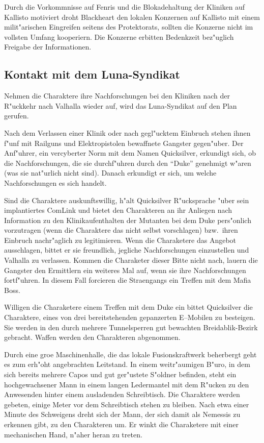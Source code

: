 Durch die Vorkommnisse auf Fenris und die Blokadehaltung der Kliniken auf Kallisto motiviert droht Blackheart den lokalen Konzernen auf Kallisto mit einem milit"arischen Eingreifen seitens des Protektorats, sollten die Konzerne nicht im vollsten Umfang kooperiern. Die Konzerne erbitten Bedenkzeit bez"uglich Freigabe der Informationen.

\subsection{Kontakt mit dem Luna-Syndikat}

Nehmen die Charaktere ihre Nachforschungen bei den Kliniken nach der R"uckkehr nach Valhalla wieder auf, wird das Luna-Syndikat auf den Plan gerufen.

Nach dem Verlassen einer Klinik oder nach gegl"ucktem Einbruch stehen ihnen f"unf mit Railguns und Elektropistolen bewaffnete Gangster gegen"uber. Der Anf"uhrer, ein vercyberter Norm mit dem Namen Quicksilver, erkundigt sich, ob die Nachforschungen, die sie durchf"uhren durch den "`Duke"' genehmigt w"aren (was sie nat"urlich nicht sind). Danach erkundigt er sich, um welche Nachforschungen es sich handelt.

Sind die Charaktere auskunftswillig, h"alt Quicksilver R"ucksprache "uber sein implantiertes ComLink und bietet den Charakteren an ihr Anliegen nach Information zu den Klinikaufenthalten der Mutanten bei dem Duke pers"onlich vorzutragen (wenn die Charaktere das nicht selbst vorschlagen) bzw.~ihren Einbruch nachr"aglich zu legitimieren. Wenn die Charaketere das Angebot ausschlagen, bittet er sie freundlich, jegliche Nachforschungen einzustellen und Valhalla zu verlassen. Kommen die Charaketer dieser Bitte nicht nach, lauern die Gangster den Ermittlern ein weiteres Mal auf, wenn sie ihre Nachforschungen fortf"uhren. In diesem Fall forcieren die Stra\3engangs ein Treffen mit dem Mafia Boss.

Willigen die Charaketere einem Treffen mit dem Duke ein bittet Quicksilver die Charaktere, eines von drei bereitstehenden gepanzerten E--Mobilen zu besteigen. Sie werden in den durch mehrere Tunnelsperren gut bewachten Breidablik-Bezirk gebracht. Waffen werden den Charakteren abgenommen.

Durch eine gro\3e Maschinenhalle, die das lokale Fusionskraftwerk beherbergt geht es zum erh"oht angebrachten Leitstand. In einem weitr"aumigen B"uro, in dem sich bereits mehrere Capos und gut ger"ustete S"oldner befinden, steht
ein hochgewachsener Mann in einem langen Ledermantel mit dem R"ucken zu den Anwesenden hinter einem ausladenden Schreibtisch. Die Charaktere werden gebeten, einige Meter vor dem Schreibtisch stehen zu bleiben. Nach etwa einer Minute des Schweigens dreht sich der Mann, der sich damit als Nemessis zu erkennen gibt, zu den Charakteren um. Er winkt die Charaketere mit einer mechanischen Hand, n"aher heran zu treten.

